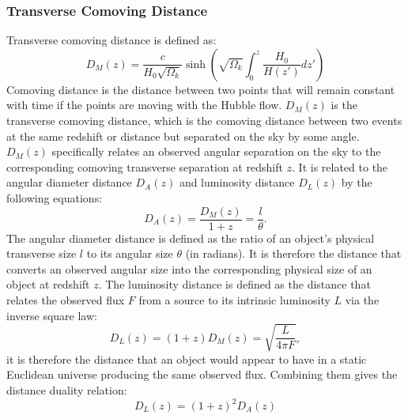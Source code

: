 \documentclass{article}
\begin{document}
\subsubsection{Transverse Comoving Distance}
Transverse comoving distance is defined as:
\begin{equation}
		D_M(z) = \frac{c}{H_0 \sqrt{\Omega_k}} \sinh\left(\sqrt{\Omega_k} \int_0^z \frac{H_0}{H(z')} dz'\right)
\end{equation}
Comoving distance is the distance between two points that will remain constant with time if the points are moving with the Hubble flow. $D_M(z)$ is the transverse comoving distance, which is the comoving distance between two events at the same redshift or distance but separated on the sky by some angle. $D_M(z)$ specifically relates an observed angular separation on the sky to the corresponding comoving transverse separation at redshift $z$. It is related to the angular diameter distance $D_A(z)$ and luminosity distance $D_L(z)$ by the following equations:
\begin{equation}
		D_A(z) = \frac{D_M(z)}{1+z} = \frac{l}{\theta}.
\end{equation}
The angular diameter distance is defined as the ratio of an object's physical transverse size $l$ to its angular size $\theta$ (in radians). It is therefore the distance that converts an observed angular size into the corresponding physical size of an object at redshift $z$. 
The luminosity distance is defined as the distance that relates the observed flux $F$ from a source to its intrinsic luminosity $L$ via the inverse square law:
\begin{equation}
		D_L(z) = (1+z) D_M(z) = \sqrt{\frac{L}{4 \pi F}},
\end{equation}
it is therefore the distance that an object would appear to have in a static Euclidean universe producing the same observed flux.
Combining them gives the distance duality relation:
\begin{equation}
		D_L(z) = (1+z)^2 D_A(z)
\end{equation}
\end{document}
